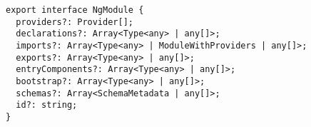 \begin{verbatim}
export interface NgModule {
  providers?: Provider[];
  declarations?: Array<Type<any> | any[]>;
  imports?: Array<Type<any> | ModuleWithProviders | any[]>;
  exports?: Array<Type<any> | any[]>;
  entryComponents?: Array<Type<any> | any[]>;
  bootstrap?: Array<Type<any> | any[]>;
  schemas?: Array<SchemaMetadata | any[]>;
  id?: string;
}
\end{verbatim}

